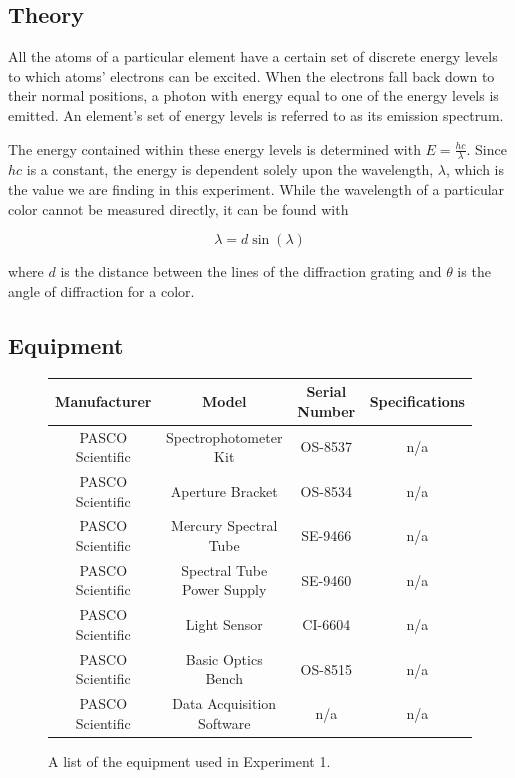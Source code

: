 \documentclass{article}
\begin{document}
\subsection{Theory}

\qq All the atoms of a particular element have a certain set of discrete
energy levels to which atoms' electrons can be excited. When the electrons fall
back down to their normal positions, a photon with energy equal to one of the
energy levels is emitted. An element's set of energy levels is referred to as
its emission spectrum. 

\qq The energy contained within these energy levels is determined with \(E =
\frac{hc}{\lambda}\). Since \(hc\) is a constant, the energy is dependent solely
upon the wavelength, \(\lambda\), which is the value we are finding in this
experiment. While the wavelength of a particular color cannot be measured
directly, it can be found with

\begin{equation}
  \label{eqn:wavelength}
  \lambda = d \sin{(\lambda)}
\end{equation}

where \(d\) is the distance between the lines of the diffraction grating and
\(\theta\) is the angle of diffraction for a color.

\subsection{Equipment}

\begin{figure}[H]
  \label{tab:equipmentExp1}
  \caption{A list of the equipment used in Experiment 1.}
  \begin{center}
    \begin{tabular}{|c|c|c|c|}
      \hline
      Manufacturer & Model & Serial Number & Specifications \\
      \hline
      PASCO Scientific & Spectrophotometer Kit & OS-8537 & n/a \\
      PASCO Scientific & Aperture Bracket & OS-8534 & n/a \\
      PASCO Scientific & Mercury Spectral Tube & SE-9466 & n/a \\
      PASCO Scientific & Spectral Tube Power Supply & SE-9460 & n/a \\
      PASCO Scientific & Light Sensor & CI-6604 & n/a \\
      PASCO Scientific & Basic Optics Bench & OS-8515 & n/a \\
      PASCO Scientific & Data Acquisition Software & n/a & n/a \\
      \hline
    \end{tabular}
  \end{center}
\end{figure}
\end{document}
